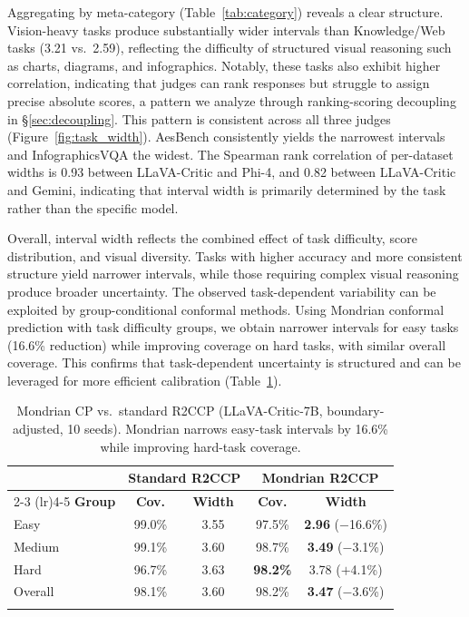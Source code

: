 \documentclass{article}
\begin{document}
Aggregating by meta-category (Table~\ref{tab:category}) reveals a clear structure. Vision-heavy tasks produce substantially wider intervals than Knowledge/Web tasks (3.21 vs.\ 2.59), reflecting the difficulty of structured visual reasoning such as charts, diagrams, and infographics. Notably, these tasks also exhibit higher correlation, indicating that judges can rank responses but struggle to assign precise absolute scores, a pattern we analyze through ranking-scoring decoupling in \S\ref{sec:decoupling}. This pattern is consistent across all three judges (Figure~\ref{fig:task_width}). AesBench consistently yields the narrowest intervals and InfographicsVQA the widest. The Spearman rank correlation of per-dataset widths is 0.93 between LLaVA-Critic and Phi-4, and 0.82 between LLaVA-Critic and Gemini, indicating that interval width is primarily determined by the task rather than the specific model.

Overall, interval width reflects the combined effect of task difficulty, score distribution, and visual diversity. Tasks with higher accuracy and more consistent structure yield narrower intervals, while those requiring complex visual reasoning produce broader uncertainty. The observed task-dependent variability can be exploited by group-conditional conformal methods. Using Mondrian conformal prediction with task difficulty groups, we obtain narrower intervals for easy tasks (16.6\% reduction) while improving coverage on hard tasks, with similar overall coverage. This confirms that task-dependent uncertainty is structured and can be leveraged for more efficient calibration (Table~\ref{tab:mondrian}).

\begin{table}[t]
\centering
\caption{Mondrian CP vs.\ standard R2CCP (LLaVA-Critic-7B, boundary-adjusted, 10 seeds). Mondrian narrows easy-task intervals by 16.6\% while improving hard-task coverage.}
\label{tab:mondrian}
\small
\begin{tabular}{lcccc}
\toprule
& \multicolumn{2}{c}{\textbf{Standard R2CCP}} & \multicolumn{2}{c}{\textbf{Mondrian R2CCP}} \\
\cmidrule(lr){2-3} \cmidrule(lr){4-5}
\textbf{Group} & \textbf{Cov.} & \textbf{Width} & \textbf{Cov.} & \textbf{Width} \\
\midrule
Easy & 99.0\% & 3.55 & 97.5\% & \textbf{2.96} ($-$16.6\%) \\
Medium & 99.1\% & 3.60 & 98.7\% & \textbf{3.49} ($-$3.1\%) \\
Hard & 96.7\% & 3.63 & \textbf{98.2\%} & 3.78 ($+$4.1\%) \\
\midrule
Overall & 98.1\% & 3.60 & 98.2\% & \textbf{3.47} ($-$3.6\%) \\
\bottomrule \vspace{-10pt}
\end{tabular}
\end{table}
\end{document}
